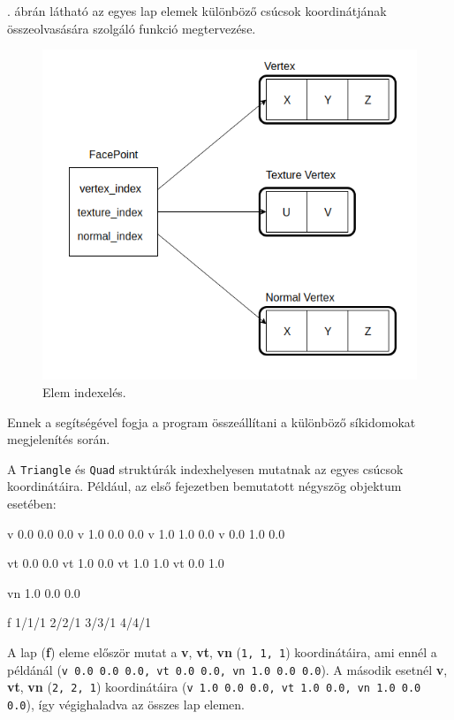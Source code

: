 
. ábrán látható az egyes lap elemek különböző csúcsok koordinátjának összeolvasására szolgáló funkció megtervezése.

\begin{figure}[h]
\centering
\includegraphics[scale=0.5]{images/point.png}
\caption{Elem indexelés.}
\label{fig:index_}
\end{figure}

\noindent Ennek a segítségével fogja a program összeállítani a különböző síkidomokat megjelenítés során.

A \texttt{Triangle} és \texttt{Quad} struktúrák indexhelyesen mutatnak az egyes csúcsok koordinátáira.
Például, az első fejezetben bemutatott négyszög objektum esetében:
\begin{python} 
v 0.0 0.0 0.0
v 1.0 0.0 0.0
v 1.0 1.0 0.0
v 0.0 1.0 0.0

vt 0.0 0.0
vt 1.0 0.0
vt 1.0 1.0
vt 0.0 1.0

vn 1.0 0.0 0.0 

f 1/1/1 2/2/1 3/3/1 4/4/1
\end{python}
A lap (\textbf{f}) eleme először mutat a \textbf{v}, \textbf{vt}, \textbf{vn} (\texttt{1, 1, 1}) koordinátáira, ami ennél a példánál (\texttt{v 0.0 0.0 0.0, vt 0.0 0.0, vn 1.0 0.0 0.0}).
A második esetnél \textbf{v}, \textbf{vt}, \textbf{vn} (\texttt{2, 2, 1}) koordinátáira (\texttt{v 1.0 0.0 0.0, vt 1.0 0.0, vn 1.0 0.0 0.0}), így végighaladva az összes lap elemen.
